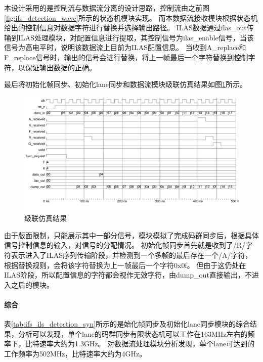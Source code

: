 \documentclass[UTF8]{ctexart}
\begin{document}
本设计采用的是控制流与数据流分离的设计思路，控制流由之前图\ref{fig:ifs_detection_wave}所示的状态机模块实现。
而本数据流接收模块根据状态机给出的控制信息对数据字符进行替换并选择输出路径。
ILAS数据通过ilas\_out传输到ILAS处理模块，对配置信息进行提取，其控制信号为ilas\_enable信号，当该信号为高电平时，说明该数据流上目前为ILAS配置信息。
当收到A\_replace和F\_replace信号时，输出的信号会进行替换，将上一帧最后一个字符替换到控制字符，以保证输出数据的正确。

最后将初始化帧同步、初始化lane同步和数据流模块级联仿真结果如图\ref{fig:recv_top_wave}所示。

\begin{figure}[H]
	\centering
	\includegraphics[width=18cm]{./img/recv_top_wave.pdf}
	\caption{级联仿真结果}
	\label{fig:recv_top_wave}
\end{figure}

由于版面限制，只能展示其中一部分信号，模块模拟了完成码群同步后，根据具体信号控制信息的输入，对信号的分配情况。
初始化帧同步首先就是收到了/R/字符表示进入了ILAS序列传输阶段，并检测到一个多帧的最后存在一个/A/字符，根据替换规则，会将该字符替换为上一帧最后一个字符0x0f。
但由于这仍处在ILAS阶段，所以配置信息的字符都会视作无效字符，由dump\_out直接输出，不进入之后的模块。

\paragraph{综合}

表\ref{tab:ifs_ils_detection_syn}所示的是始化帧同步及初始化lane同步模块的综合结果，分析可以发现，单个lane的码群同步有限状态机可以工作在163MHz左右的频率下，比特速率大约为1.3GHz。
对数据流处理模块分析发现，单个lane可达到的工作频率为502MHz，比特速率大约为4GHz。
\end{document}
